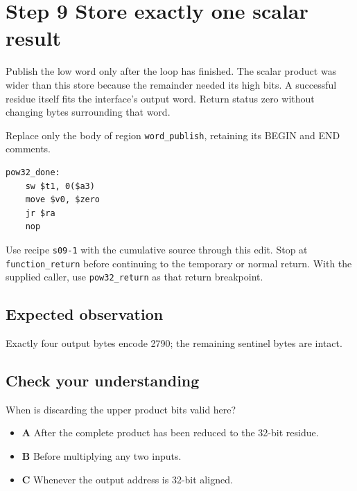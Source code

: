\section{Step 9 Store exactly one scalar result}\label{rsa-s09}

Publish the low word only after the loop has finished. The scalar product was wider than this store because the remainder needed its high bits. A successful residue itself fits the interface's output word. Return status zero without changing bytes surrounding that word.

Replace only the body of region \texttt{word\_publish}, retaining its BEGIN and END comments.

\begin{verbatim}
pow32_done:
    sw $t1, 0($a3)
    move $v0, $zero
    jr $ra
    nop
\end{verbatim}

Use recipe \texttt{s09-1} with the cumulative source through this edit. Stop at \texttt{function\_return} before continuing to the temporary or normal return. With the supplied caller, use \texttt{pow32\_return} as that return breakpoint.

\subsection{Expected observation}
Exactly four output bytes encode 2790; the remaining sentinel bytes are intact.

\subsection{Check your understanding}
When is discarding the upper product bits valid here?

\begin{itemize}
  \item \textbf{A} After the complete product has been reduced to the 32-bit residue.
  \item \textbf{B} Before multiplying any two inputs.
  \item \textbf{C} Whenever the output address is 32-bit aligned.
\end{itemize}

